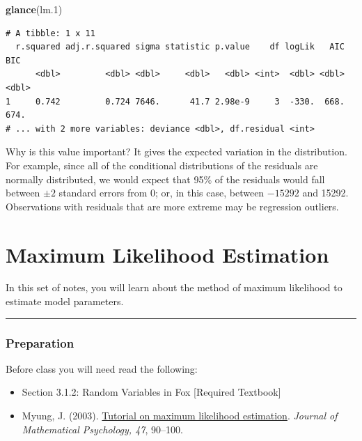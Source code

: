 \documentclass[]{book}
\newenvironment{Shaded}{\begin{snugshade}}{\end{snugshade}}
\newcommand{\FloatTok}[1]{\textcolor[rgb]{0.00,0.00,0.81}{#1}}
\newcommand{\KeywordTok}[1]{\textcolor[rgb]{0.13,0.29,0.53}{\textbf{#1}}}
\newcommand{\NormalTok}[1]{#1}
\providecommand{\tightlist}{%
  \setlength{\itemsep}{0pt}\setlength{\parskip}{0pt}}
\begin{document}
\begin{Shaded}
\begin{Highlighting}[]
\KeywordTok{glance}\NormalTok{(lm}\FloatTok{.1}\NormalTok{)}
\end{Highlighting}
\end{Shaded}

\begin{verbatim}
# A tibble: 1 x 11
  r.squared adj.r.squared sigma statistic p.value    df logLik   AIC   BIC
      <dbl>         <dbl> <dbl>     <dbl>   <dbl> <int>  <dbl> <dbl> <dbl>
1     0.742         0.724 7646.      41.7 2.98e-9     3  -330.  668.  674.
# ... with 2 more variables: deviance <dbl>, df.residual <int>
\end{verbatim}

Why is this value important? It gives the expected variation in the distribution. For example, since all of the conditional distributions of the residuals are normally distributed, we would expect that 95\% of the residuals would fall between \(\pm2\) standard errors from 0; or, in this case, between \(-15292\) and 15292. Observations with residuals that are more extreme may be regression outliers.

\hypertarget{maximum-likelihood-estimation}{%
\chapter{Maximum Likelihood Estimation}\label{maximum-likelihood-estimation}}

In this set of notes, you will learn about the method of maximum likelihood to estimate model parameters.

\begin{center}\rule{0.5\linewidth}{\linethickness}\end{center}

\hypertarget{preparation-4}{%
\subsection*{Preparation}\label{preparation-4}}

Before class you will need read the following:

\begin{itemize}
\tightlist
\item
  Section 3.1.2: Random Variables in Fox {[}Required Textbook{]}
\item
  Myung, J. (2003). \href{http://times.cs.uiuc.edu/course/410/note/mle.pdf}{Tutorial on maximum likelihood estimation}. \emph{Journal of Mathematical Psychology, 47}, 90--100.
\end{itemize}
\end{document}
